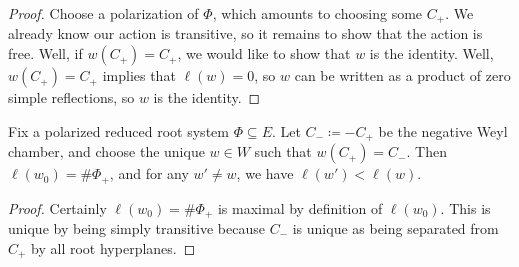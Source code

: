\documentclass[../notes.tex]{subfiles}
\begin{document}
\begin{proof}
	Choose a polarization of $\Phi$, which amounts to choosing some $C_+$. We already know our action is transitive, so it remains to show that the action is free. Well, if $w(C_+)=C_+$, we would like to show that $w$ is the identity. Well, $w(C_+)=C_+$ implies that $\ell(w)=0$, so $w$ can be written as a product of zero simple reflections, so $w$ is the identity.
\end{proof}
\begin{corollary}
	Fix a polarized reduced root system $\Phi\subseteq E$. Let $C_-\coloneqq-C_+$ be the negative Weyl chamber, and choose the unique $w\in W$ such that $w(C_+)=C_-$. Then $\ell(w_0)=\#\Phi_+$, and for any $w'\ne w$, we have $\ell(w')<\ell(w)$.
\end{corollary}
\begin{proof}
	Certainly $\ell(w_0)=\#\Phi_+$ is maximal by definition of $\ell(w_0)$. This is unique by being simply transitive because $C_-$ is unique as being separated from $C_+$ by all root hyperplanes.
\end{proof}
\end{document}
